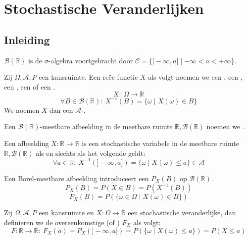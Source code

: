 \documentclass[main.tex]{subfiles}
\begin{document}
\chapter{Stochastische Veranderlijken}
\label{cha:stoch-verand}

\section{Inleiding}
\label{sec:inleiding}

\begin{de}
  $\mathcal{B}(\mathbb{R})$ is de $\sigma$-algebra voortgebracht door $\mathcal{C} = \{ ]-\infty,a]\mid -\infty < a < +\infty \}$.
\end{de}

\begin{de}
  Zij $\Omega, \mathcal{A}, P$ een kansruimte.
  Een re\"ee functie $X$ als volgt noemen we een , een , een , een  of een .
  \[ X:\ \Omega \rightarrow \mathbb{R} \]
  \[ \forall B\in \mathcal{B}(\mathbb{R}):\ X^{-1}(B) = \{\omega \mid X(\omega) \in B \} \]
  We noemen $X$ dan een $\mathcal{A}$-.
  
\end{de}

\begin{de}
  Een $\mathcal{B}(\mathbb{R})$-meetbare afbeelding in de meetbare ruimte $\mathbb{R},\mathcal{B}(\mathbb{R})$ noemen we .
\end{de}

\begin{st}
  Een afbeelding $X: \mathbb{R} \rightarrow \mathbb{R}$ is een stochastische variabele in de meetbare ruimte $\mathbb{R},\mathcal{B}(\mathbb{R})$ als en slechts als het volgende geldt:
  \[ \forall a \in \mathbb{R}:\ X^{-1}(]-\infty,a]) = \{ \omega\mid X(\omega) \le a\} \in \mathcal{A} \]
  \zb
\end{st}

\begin{st}
  Een Borel-meetbare afbeelding introduceert een  $P_{X}(B)$ op $\mathcal{B}(\mathbb{R})$.
  \[ P_{X}(B) = P(X \in B) = P(X^{-1}(B)) \]
  \[ P_{X}(B) = P(\{\omega \in \Omega \mid X(\omega) \in B \}) \]
\end{st}

\begin{de}
  Zij $\Omega,\mathcal{A},P$ een kansruimte en $X: \Omega \rightarrow \mathbb{R}$ een stochastische veranderlijke, dan definieren we de overeenkomstige  (of ) $F_{X}$ als volgt:
  \[ F: \mathbb{R} \rightarrow \mathbb{R}:\ F_{X}(a) = P_{X}(]-\infty,a]) = P(\{\omega\mid X(\omega) \le a\}) = P(X \le a) \]
\end{de}
\end{document}
